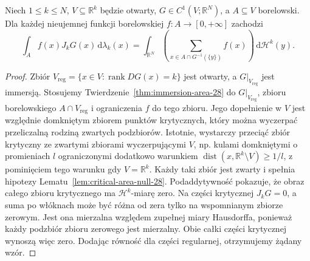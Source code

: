 \begin{lemat}
\label{lem:c1-general-area-28}
Niech $1\le k\le N$, $V\subseteq\mathbb R^k$ będzie
otwarty, $G\in C^1(V;\mathbb R^N)$, a $A\subseteq V$
borelowski. Dla każdej nieujemnej funkcji borelowskiej
$f:A\to[0,+\infty]$ zachodzi
\[
 \int_Af(x)J_kG(x)\,\mathrm d\lambda_k(x)
 =\int_{\mathbb R^N}\left(
 \sum_{x\in A\cap G^{-1}(\{y\})}f(x)\right)
 \,\mathrm d\mathcal H^k(y).
\]
\end{lemat}
\begin{proof}
Zbiór $V_{\mathrm{reg}}=\{x\in V:\operatorname{rank}DG(x)=k\}$
jest otwarty, a $G|_{V_{\mathrm{reg}}}$ jest immersją.
Stosujemy Twierdzenie~\ref{thm:immersion-area-28}
do $G|_{V_{\mathrm{reg}}}$, zbioru borelowskiego
$A\cap V_{\mathrm{reg}}$ i ograniczenia $f$ do tego zbioru.
Jego dopełnienie w $V$ jest względnie domkniętym
zbiorem punktów krytycznych, który można wyczerpać
przeliczalną rodziną zwartych podzbiorów.
Istotnie, wystarczy przeciąć zbiór krytyczny ze
zwartymi zbiorami wyczerpującymi $V$, np. kulami
domkniętymi o promieniach $l$ ograniczonymi dodatkowo
warunkiem $\operatorname{dist}(x,\mathbb R^k\setminus V)
\ge1/l$, z pominięciem tego warunku gdy $V=\mathbb R^k$.
Każdy taki zbiór jest zwarty i spełnia hipotezy
Lematu~\ref{lem:critical-area-null-28}. Podaddytywność
pokazuje, że obraz całego zbioru krytycznego ma
$\mathcal H^k$-miarę zero.
Na części krytycznej $J_kG=0$, a suma po włóknach
może być różna od zera tylko na wspomnianym
zbiorze zerowym. Jest ona mierzalna względem zupełnej
miary Hausdorffa, ponieważ każdy podzbiór zbioru
zerowego jest mierzalny. Obie całki części krytycznej
wynoszą więc zero. Dodając równość dla części
regularnej, otrzymujemy żądany wzór.
\end{proof}

